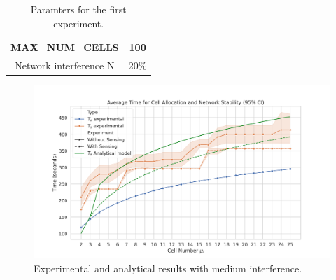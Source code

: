 \documentclass{comnets-thesis}
\begin{document}
\begin{table}[h]
    \centering
    \caption{Paramters for the first experiment.}
    \begin{tabular}{|c|c|}
    \hline
    MAX\_NUM\_CELLS & 100 \\ \hline
    Network interference N & 20\%  \\ \hline
    \end{tabular}
\end{table}

\begin{figure}[H]
    \centering
    \includegraphics[width=1\textwidth]{./images/experiment1.png}
    \caption{Experimental and analytical results with medium interference.}
    \label{fig:experiment-1}
\end{figure}
\end{document}
